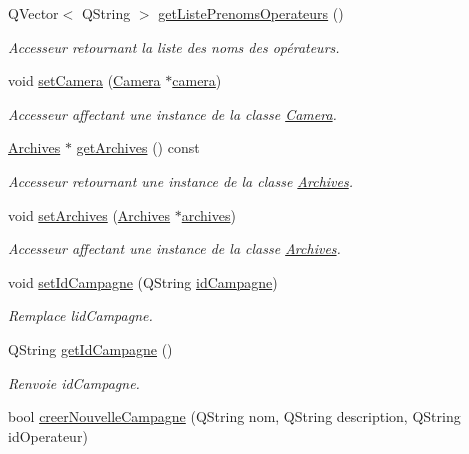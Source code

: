 \begin{DoxyCompactItemize}
Q\+Vector$<$ Q\+String $>$ \hyperlink{class_rov_a128cae6dc19025017dea26663adde765}{get\+Liste\+Prenoms\+Operateurs} ()
\begin{DoxyCompactList}\small\item\em Accesseur retournant la liste des noms des opérateurs. \end{DoxyCompactList}\item 
void \hyperlink{class_rov_a0eba2119b89406948976ae92781c4629}{set\+Camera} (\hyperlink{class_camera}{Camera} $\ast$\hyperlink{class_rov_ad0461ecece812497ee9b4a962f168c18}{camera})
\begin{DoxyCompactList}\small\item\em Accesseur affectant une instance de la classe \hyperlink{class_camera}{Camera}. \end{DoxyCompactList}\item 
\hyperlink{class_archives}{Archives} $\ast$ \hyperlink{class_rov_af0936fd10d04851d53f28575ecd1da3f}{get\+Archives} () const
\begin{DoxyCompactList}\small\item\em Accesseur retournant une instance de la classe \hyperlink{class_archives}{Archives}. \end{DoxyCompactList}\item 
void \hyperlink{class_rov_acb3ecbb04ace455526206d3c05b712fd}{set\+Archives} (\hyperlink{class_archives}{Archives} $\ast$\hyperlink{class_rov_ad41ed46f169f28da226a979f70c4d8a4}{archives})
\begin{DoxyCompactList}\small\item\em Accesseur affectant une instance de la classe \hyperlink{class_archives}{Archives}. \end{DoxyCompactList}\item 
void \hyperlink{class_rov_a9bbaec4a59dae307440bfeefbc56190b}{set\+Id\+Campagne} (Q\+String \hyperlink{class_rov_aaaed58cd7ee9edbeab5251cd413a1bae}{id\+Campagne})
\begin{DoxyCompactList}\small\item\em Remplace l\textquotesingle{}id\+Campagne. \end{DoxyCompactList}\item 
Q\+String \hyperlink{class_rov_aaf98d93ef9b164a2e1766494d9577b57}{get\+Id\+Campagne} ()
\begin{DoxyCompactList}\small\item\em Renvoie id\+Campagne. \end{DoxyCompactList}\item 
bool \hyperlink{class_rov_ae1306036b067e9ad50a09f9dd607a092}{creer\+Nouvelle\+Campagne} (Q\+String nom, Q\+String description, Q\+String id\+Operateur)

\end{DoxyCompactItemize}
